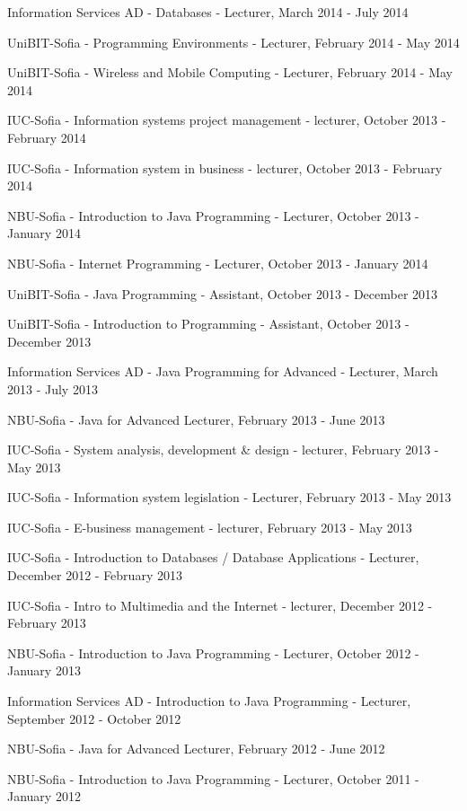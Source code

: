 \documentclass[english,a4paper]{europasscv}
\begin{document}
\begin{europasscv}
{\begin{ecvitemize}
    \item Information Services AD - Databases - Lecturer, March 2014 - July 2014
    \item UniBIT-Sofia - Programming Environments - Lecturer, February 2014 - May 2014
    \item UniBIT-Sofia - Wireless and Mobile Computing - Lecturer, February 2014 - May 2014
    \item IUC-Sofia - Information systems project management - lecturer, October 2013 - February 2014
    \item IUC-Sofia - Information system in business - lecturer, October 2013 - February 2014
    \item NBU-Sofia - Introduction to Java Programming - Lecturer, October 2013 - January 2014
    \item NBU-Sofia - Internet Programming - Lecturer, October 2013 - January 2014
    \item UniBIT-Sofia - Java Programming - Assistant, October 2013 - December 2013
    \item UniBIT-Sofia - Introduction to Programming - Assistant, October 2013 - December 2013
    \item Information Services AD - Java Programming for Advanced - Lecturer, March 2013 - July 2013
    \item NBU-Sofia - Java for Advanced Lecturer, February 2013 - June 2013
    \item IUC-Sofia - System analysis, development \& design - lecturer, February 2013 - May 2013
    \item IUC-Sofia - Information system legislation - Lecturer, February 2013 - May 2013
    \item IUC-Sofia - E-business management - lecturer, February 2013 - May 2013
    \item IUC-Sofia - Introduction to Databases / Database Applications - Lecturer, December 2012 - February 2013
    \item IUC-Sofia - Intro to Multimedia and the Internet - lecturer, December 2012 - February 2013
        \item NBU-Sofia - Introduction to Java Programming - Lecturer, October 2012 - January 2013
    \item Information Services AD - Introduction to Java Programming - Lecturer, September 2012 - October 2012
    \item NBU-Sofia - Java for Advanced Lecturer, February 2012 - June 2012
    \item NBU-Sofia - Introduction to Java Programming - Lecturer, October 2011 - January 2012

\end{ecvitemize}}
\end{europasscv}
\end{document}
